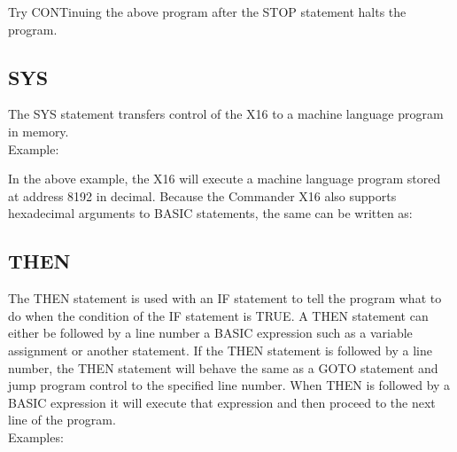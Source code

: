 Try {\ttfamily CONT}inuing the above program after the {\ttfamily STOP}
statement halts the program.\\

\subsection{SYS}

The {\ttfamily SYS} statement transfers control of the X16 to a machine
language program in memory.\\

Example:\\


In the above example, the X16 will execute a machine language program stored at
address 8192 in decimal.  Because the Commander X16 also supports hexadecimal
arguments to BASIC statements, the same can be written as:\\


\subsection{THEN}

The {\ttfamily THEN} statement is used with an {\ttfamily IF} statement to tell
the program what to do when the condition of the {\ttfamily IF} statement is
{\ttfamily TRUE}.  A {\ttfamily THEN} statement can either be followed by a
line number a BASIC expression such as a variable assignment or another
statement.  If the {\ttfamily THEN} statement is followed by a line number, the
{\ttfamily THEN} statement will behave the same as a {\ttfamily GOTO} statement
and jump program control to the specified line number.  When {\ttfamily THEN}
is followed by a BASIC expression it will execute that expression and then
proceed to the next line of the program.\\

Examples:\\


